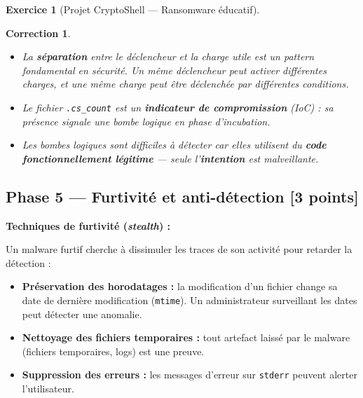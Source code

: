 \documentclass[a4paper,11pt]{article}
\theoremstyle{plain}
\newtheorem{correction}{Correction}
\theoremstyle{definition}
\newtheorem{exercice}{Exercice}
\begin{document}
\begin{exercice}[Projet CryptoShell --- Ransomware éducatif]
\begin{correction}
\begin{pointcle}
\begin{itemize}
    \item La \textbf{séparation} entre le déclencheur et la charge utile est un pattern fondamental en sécurité. Un même déclencheur peut activer différentes charges, et une même charge peut être déclenchée par différentes conditions.
    \item Le fichier \texttt{.cs\_count} est un \textbf{indicateur de compromission} (IoC) : sa présence signale une bombe logique en phase d'incubation.
    \item Les bombes logiques sont difficiles à détecter car elles utilisent du \textbf{code fonctionnellement légitime} --- seule l'\textbf{intention} est malveillante.
\end{itemize}
\end{pointcle}

\end{correction}



\subsection*{Phase 5 --- Furtivité et anti-détection \hfill \normalsize [3 points]}

\begin{rappel}
\textbf{Techniques de furtivité (\textit{stealth}) :}

Un malware furtif cherche à dissimuler les traces de son activité pour retarder la détection :
\begin{itemize}
    \item \textbf{Préservation des horodatages :} la modification d'un fichier change sa date de dernière modification (\texttt{mtime}). Un administrateur surveillant les dates peut détecter une anomalie.
    \item \textbf{Nettoyage des fichiers temporaires :} tout artefact laissé par le malware (fichiers temporaires, logs) est une preuve.
    \item \textbf{Suppression des erreurs :} les messages d'erreur sur \texttt{stderr} peuvent alerter l'utilisateur.
\end{itemize}


\end{rappel}
\end{exercice}
\end{document}
